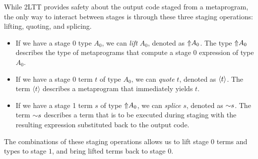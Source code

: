 While 2LTT provides safety about the output code staged from a metaprogram, the only way to interact between stages is through these three staging operations: lifting, quoting, and splicing. 

\begin{itemize}
    \item If we have a stage 0 type $A_0$, we can \emph{lift} $A_0$, denoted as ${\Uparrow} A_0$. The type ${\Uparrow} A_0$ describes the type of metaprograms that compute a stage $0$ expression of type $A_0$. 
    \item If we have a stage 0 term $t$ of type $A_0$, we can \emph{quote} $t$, denoted as $\langle t\rangle$. The term $\langle t\rangle$ describes a metaprogram that immediately yields $t$.
    \item If we have a stage 1 term $s$ of type ${\Uparrow} A_0$, we can \emph{splice} $s$, denoted as ${\sim} s$. The term ${\sim} s$ describes a term that is to be executed during staging with the resulting expression substituted back to the output code. 


\end{itemize}

The combinations of these staging operations allows us to lift stage $0$ terms and types to stage $1$, and bring lifted terms back to stage $0$.

